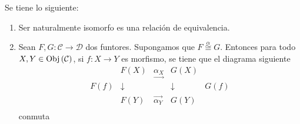 \documentclass[12pt]{report}
\newcounter{it}
\theoremstyle{largebreak}
\newcommand\cf[3]{\ensuremath{#1:#2\rightarrow#3}}
\newcommand{\Obj}[1]{\ensuremath{\textup{Obj}\left(#1\right)}}
\begin{document}
    \begin{obs}
        Se tiene lo siguiente:
        \begin{enumerate}
            \item Ser naturalmente isomorfo es una relación de equivalencia.
            \item Sean $\cf{F,G}{\mathcal{C}}{\mathcal{D}}$ dos funtores. Supongamos que $F\overset{\alpha}{\cong}G$. Entonces para todo $X,Y\in\Obj{\mathcal{C}}$, si $\cf{f}{X}{Y}$ es morfismo, se tiene que el diagrama siguiente
            \begin{equation*}
                \begin{array}{rcccl}
                    & F(X) & \underset{\longrightarrow}{\alpha_{X}} & G(X) &\\
                    F(f) & \downarrow & & \downarrow & G(f) \\
                    & F(Y) & \overset{\longrightarrow}{\alpha_{Y}} & G(Y) &\\
                \end{array}
            \end{equation*}
            conmuta
        \end{enumerate}
    \end{obs}

    \renewcommand{\theenumi}{\arabic{enumi}}
\end{document}
